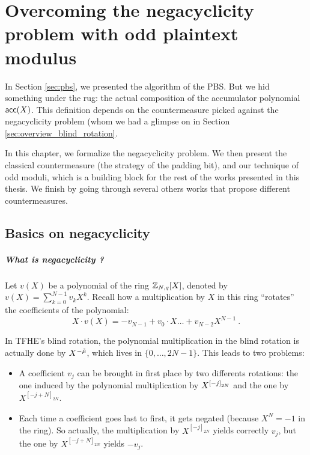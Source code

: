 
\chapter{Overcoming the negacyclicity problem with odd plaintext modulus}
\label{chap:negacyclicity}

In Section \ref{sec:pbs}, we presented the algorithm of the PBS. But we hid something under the rug: the actual composition of the accumulator polynomial $\textsf{acc}(X)$. This definition depends on the countermeasure picked against the negacyclicity problem (whom we had a glimpse on  in Section \ref{sec:overview_blind_rotation}. 


In this chapter, we formalize the negacyclicity problem. We then present the classical countermeasure (the strategy of the padding bit), and our technique of odd moduli, which is a building block for the rest of the works presented in this thesis. We finish by going through several others works that propose different countermeasures.




\section{Basics on negacyclicity}

\paragraph{What is negacyclicity ?}

Let $v(X)$ be a polynomial of the ring $\mathbb{Z}_{N,q}[X]$, denoted by $v(X) = \sum_{k=0}^{N-1} v_k X^k$. Recall how a multiplication by $X$  in this ring ``rotates'' the coefficients of the polynomial: \[X \cdot v(X) = - v_{N - 1} + v_0 \cdot X \dots + v_{N - 2} X^{N - 1}~.\]

In TFHE's blind rotation, the polynomial multiplication in the blind rotation is actually done by $X^{-\Tilde{\mu}}$, which lives in $\{0, \dots, 2N - 1\}$. This leads to two problems:

\begin{itemize}
	\item A coefficient $v_j$ can be brought in first place by two differents rotations: the one induced by the polynomial multiplication by $X^{\left [ -j \right ]_{2N}}$ and the one by $X^{[-j + N]_{2N}}$.
	\item Each time a coefficient goes last to first, it gets negated (because $X^N = -1$ in the ring). So actually, the multiplication by $X^{[-j]_{2N}}$ yields correctly $v_j$, but the one by $X^{[-j + N]_{2N}}$ yields $-v_j$.
\end{itemize}



